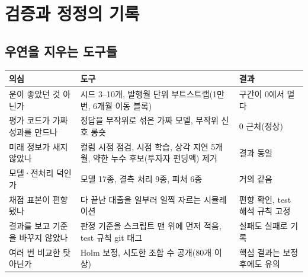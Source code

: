 \chapter{검증과 정정의 기록}

\section{우연을 지우는 도구들}
\begin{table}[H]\centering\small
\begin{tabularx}{\linewidth}{@{}p{38mm}LL@{}}\toprule
의심 & 도구 & 결과\\\midrule
운이 좋았던 것 아닌가 & 시드 3--10개, 발행월 단위 부트스트랩(1만 번, 6개월 이동 블록) & 구간이 0에서 멀다\\
평가 코드가 가짜 성과를 만드나 & 정답을 무작위로 섞은 가짜 모델, 무작위 신호 롱숏 & 0 근처(정상)\\
미래 정보가 새지 않았나 & 컬럼 시점 점검, 시점 학습, 상각 지연 5개월, 약한 누수 후보(투자자 펀딩액) 제거 & 결과 동일\\
모델·\allowbreak{}전처리 덕인가 & 모델 17종, 결측 처리 9종, 피처 6종 & 거의 같음\\
채점 표본이 편향됐나 & 다 끝난 대출을 일부러 일찍 자르는 시뮬레이션 & 편향 확인, test 해석 규칙 고정\\
결과를 보고 기준을 바꾸지 않았나 & 판정 기준을 스크립트 맨 위에 먼저 적음, test 규칙 git 태그 & 실패도 실패로 기록\\
여러 번 비교한 탓 아닌가 & Holm 보정, 시도한 조합 수 공개(80개 이상) & 핵심 결과는 보정 후에도 유의\\\bottomrule
\end{tabularx}
\end{table}


